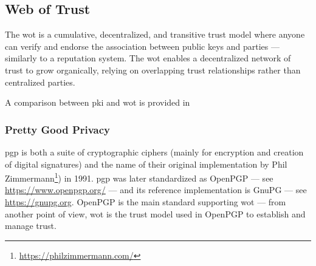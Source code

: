 \subsection{Web of Trust}\label{sec:binding_keys_to_parties:wot}

The \gls{wot} is a cumulative, decentralized, and transitive trust model where anyone can verify and endorse the association between public keys and parties --- similarly to a reputation system. The \gls{wot} enables a decentralized network of trust to grow organically, relying on overlapping trust relationships rather than centralized parties. 



A comparison between \gls{pki} and \gls{wot} is provided in 

\subsubsection{Pretty Good Privacy}\label{sec:binding_keys_to_parties:wot:pgp}

\gls{pgp} is both a suite of cryptographic ciphers (mainly for encryption and creation of digital signatures) and the name of their original implementation by Phil Zimmermann\footnote{\url{https://philzimmermann.com/}}) in 1991. \gls{pgp} was later standardized as OpenPGP \cite{rfc9580} --- see \url{https://www.openpgp.org/} --- and its reference implementation is GnuPG --- see \url{https://gnupg.org}. OpenPGP is the main standard supporting \gls{wot} --- from another point of view, \gls{wot} is the trust model used in OpenPGP to establish and manage trust.

